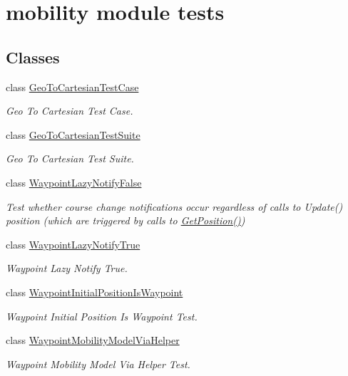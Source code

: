 \hypertarget{group__mobility-test}{}\section{mobility module tests}
\label{group__mobility-test}
\subsection*{Classes}
\begin{DoxyCompactItemize}
\item 
class \hyperlink{classGeoToCartesianTestCase}{Geo\+To\+Cartesian\+Test\+Case}
\begin{DoxyCompactList}\small\item\em Geo To Cartesian Test Case. \end{DoxyCompactList}\item 
class \hyperlink{classGeoToCartesianTestSuite}{Geo\+To\+Cartesian\+Test\+Suite}
\begin{DoxyCompactList}\small\item\em Geo To Cartesian Test Suite. \end{DoxyCompactList}\item 
class \hyperlink{classWaypointLazyNotifyFalse}{Waypoint\+Lazy\+Notify\+False}
\begin{DoxyCompactList}\small\item\em Test whether course change notifications occur regardless of calls to Update() position (which are triggered by calls to \hyperlink{lena-cqi-threshold_8cc_acebf763e1a0478cec225f9547941ae54}{Get\+Position()}) \end{DoxyCompactList}\item 
class \hyperlink{classWaypointLazyNotifyTrue}{Waypoint\+Lazy\+Notify\+True}
\begin{DoxyCompactList}\small\item\em Waypoint Lazy Notify True. \end{DoxyCompactList}\item 
class \hyperlink{classWaypointInitialPositionIsWaypoint}{Waypoint\+Initial\+Position\+Is\+Waypoint}
\begin{DoxyCompactList}\small\item\em Waypoint Initial Position Is Waypoint Test. \end{DoxyCompactList}\item 
class \hyperlink{classWaypointMobilityModelViaHelper}{Waypoint\+Mobility\+Model\+Via\+Helper}
\begin{DoxyCompactList}\small\item\em Waypoint Mobility Model Via Helper Test. \end{DoxyCompactList}\item 

\end{DoxyCompactItemize}
